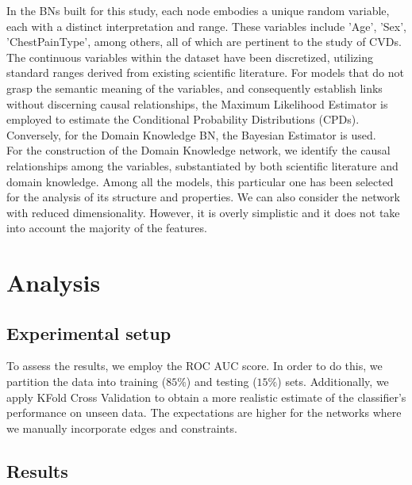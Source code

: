 \documentclass[letterpaper]{article}
\begin{document}
In the BNs built for this study, each node embodies a unique random variable, each with a distinct interpretation and range. These variables include 'Age', 'Sex', 'ChestPainType', among others, all of which are pertinent to the study of CVDs. The continuous variables within the dataset have been discretized, utilizing standard ranges derived from existing scientific literature. For models that do not grasp the semantic meaning of the variables, and consequently establish links without discerning causal relationships, the Maximum Likelihood Estimator is employed to estimate the Conditional Probability Distributions (CPDs). Conversely, for the Domain Knowledge BN, the Bayesian Estimator is used.\\
For the construction of the Domain Knowledge network, we identify the causal relationships among the variables, substantiated by both scientific literature and domain knowledge. Among all the models, this particular one has been selected for the analysis of its structure and properties.
We can also consider the network with reduced dimensionality. However, it is overly simplistic and it does not take into account the majority of the features.

\section{Analysis}
\subsection{Experimental setup}

To assess the results, we employ the ROC AUC score. In order to do this, we partition the data into training ($85\%$) and testing ($15\%$) sets. Additionally, we apply KFold Cross Validation to obtain a more realistic estimate of the classifier’s performance on unseen data. The expectations are higher for the networks where we manually incorporate edges and constraints.

\subsection{Results}
\end{document}
